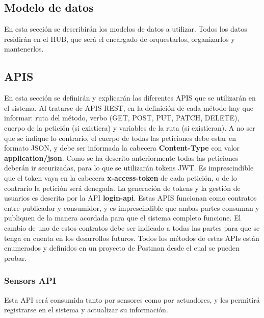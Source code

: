 \subsection{Modelo de datos}
En esta sección se describirán los modelos de datos a utilizar. Todos los datos residirán en el HUB, que será el encargado de orquestarlos,
organizarlos y mantenerlos.
\newline

\subsection{APIS}
En esta sección se definirán y explicarán las diferentes APIS que se utilizarán en el sistema. Al tratarse de APIS REST, en la definición
de cada método hay que informar: ruta del método, verbo (GET, POST, PUT, PATCH, DELETE), cuerpo de la petición (si existiera) y variables
de la ruta (si existieran). A no ser que se indique lo contrario, el cuerpo de todas las peticiones debe estar en formato JSON, y debe ser
informada la cabecera \textbf{Content-Type} con valor \textbf{application/json}.
\newline
Como se ha descrito anteriormente todas las peticiones deberán ir securizadas, para lo que se utilizarán tokens JWT. Es imprescindible que el
token vaya en la cabecera \textbf{x-access-token} de cada petición, o de lo contrario la petición será denegada. La generación de tokens y la gestión
de usuarios es descrita por la API \textbf{login-api}.
\newline
Estas APIS funcionan como contratos entre publicador y consumidor, y es imprescindible que ambas partes consuman y publiquen de la 
manera acordada para que el sistema completo funcione. El cambio de uno de estos contratos debe ser indicado a todas las partes para que se tenga
en cuenta en los desarrollos futuros.
\newline
Todos los métodos de estas APIs están enumerados y definidos en un proyecto de Postman desde el cual se pueden probar.
\newline
\subsubsection{Sensors API}
Esta API será consumida tanto por sensores como por actuadores, y les permitirá registrarse en el sistema y actualizar su información.

